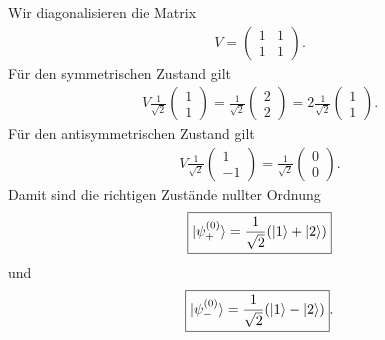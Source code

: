 \documentclass[11pt,a4paper]{scrartcl}
\begin{document}
\begin{enumerate}[label=(\alph*)]
\begin{calculationbox}
            \begin{calculationbox}[title=Diagonalisierung der Störung im entarteten Unterraum]
                Wir diagonalisieren die Matrix
                \begin{align*}
                    V
                    =
                    \begin{pmatrix}
                        1&1\\
                        1&1
                    \end{pmatrix}.
                \end{align*}
                Für den symmetrischen Zustand gilt
                \begin{align*}
                    V\frac{1}{\sqrt2}
                    \begin{pmatrix}1\\1\end{pmatrix}
                    =
                    \frac{1}{\sqrt2}
                    \begin{pmatrix}2\\2\end{pmatrix}
                    =
                    2\frac{1}{\sqrt2}
                    \begin{pmatrix}1\\1\end{pmatrix}.
                \end{align*}
                Für den antisymmetrischen Zustand gilt
                \begin{align*}
                    V\frac{1}{\sqrt2}
                    \begin{pmatrix}1\\-1\end{pmatrix}
                    =
                    \frac{1}{\sqrt2}
                    \begin{pmatrix}0\\0\end{pmatrix}.
                \end{align*}
                Damit sind die richtigen Zustände nullter Ordnung
                \begin{align*}
                    \boxed{
                    \ket{\psi_+^{(0)}}
                    =
                    \frac{1}{\sqrt2}(\ket{1}+\ket{2})}
                \end{align*}
                und
                \begin{align*}
                    \boxed{
                    \ket{\psi_-^{(0)}}
                    =
                    \frac{1}{\sqrt2}(\ket{1}-\ket{2})}.
                \end{align*}
            \end{calculationbox}


\end{calculationbox}
\end{enumerate}
\end{document}
